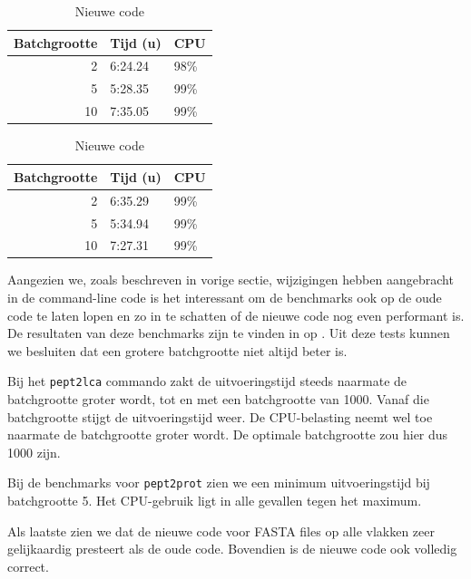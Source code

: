 \begin{table}
\begin{subtable}{.45\linewidth}
        \caption{Oude code}
        \begin{tabular}{rll}
            \toprule 
            Batchgrootte & Tijd (u) & CPU  \\
            \midrule
            2            & 6:24.24 & 98\% \\
            5            & 5:28.35 & 99\% \\
            10           & 7:35.05 & 99\% \\
            \bottomrule
        \end{tabular}
    \end{subtable}
    \begin{subtable}{.45\linewidth}
        \centering
        \caption{Nieuwe code}
        \begin{tabular}{rll}
            \toprule 
            Batchgrootte & Tijd (u) & CPU  \\
            \midrule
            2            & 6:35.29 & 99\% \\
            5            & 5:34.94 & 99\% \\
            10           & 7:27.31 & 99\% \\
            \bottomrule
        \end{tabular}
    \end{subtable}
\end{table}

Aangezien we, zoals beschreven in vorige sectie, wijzigingen hebben aangebracht 
in de command-line code is het interessant om de benchmarks ook op de oude code 
te laten lopen en zo in te schatten of de nieuwe code nog even performant is. 
De resultaten van deze benchmarks zijn te vinden in  op 
. Uit deze tests kunnen we besluiten dat een grotere 
batchgrootte niet altijd beter is. 

Bij het \texttt{pept2lca} commando zakt de uitvoeringstijd steeds naarmate de
batchgrootte groter wordt, tot en met een batchgrootte van 1000. Vanaf die
batchgrootte stijgt de uitvoeringstijd weer. De CPU-belasting neemt wel toe
naarmate de batchgrootte groter wordt. De optimale batchgrootte zou hier dus
1000 zijn.

Bij de benchmarks voor \texttt{pept2prot} zien we een minimum uitvoeringstijd
bij batchgrootte 5. Het CPU-gebruik ligt in alle gevallen tegen het maximum.

Als laatste zien we dat de nieuwe code voor FASTA files op alle vlakken zeer
gelijkaardig presteert als de oude code. Bovendien is de nieuwe code ook
volledig correct.

